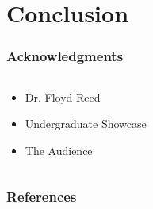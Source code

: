 \documentclass[11pt]{beamer}
\begin{document}
    \section{Conclusion}\label{sec:c}
    \begin{frame}
        
    \end{frame}

    \begin{frame}
        \frametitle{Acknowledgments}
        \begin{columns}
            \begin{column}{0.4\textwidth}
                \begin{itemize}
                    \item Dr. Floyd Reed \bigskip
                    \item Undergraduate Showcase \bigskip
                    \item The Audience \bigskip
                \end{itemize}
            \end{column}
            \begin{column}{0.5\textwidth}
                \bigskip \bigskip
                \newline
            \end{column}
        \end{columns}
    \end{frame}

    \begin{frame}
        \frametitle{References}
        \scriptsize
        
        
    \end{frame}

    \begin{frame}
    \end{frame}
\end{document}
